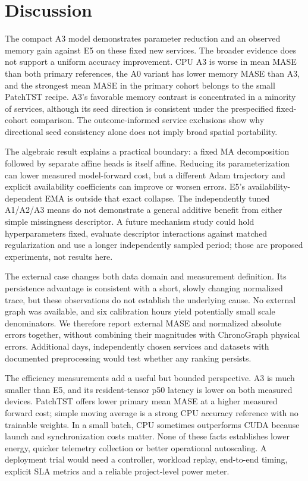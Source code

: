 \section{Discussion}\label{sec:discussion}
The compact A3 model demonstrates parameter reduction and an observed memory gain against E5 on these fixed new services. The broader evidence does not support a uniform accuracy improvement. CPU A3 is worse in mean MASE than both primary references, the A0 variant has lower memory MASE than A3, and the strongest mean MASE in the primary cohort belongs to the small PatchTST recipe. A3's favorable memory contrast is concentrated in a minority of services, although its seed direction is consistent under the prespecified fixed-cohort comparison. The outcome-informed service exclusions show why directional seed consistency alone does not imply broad spatial portability.

The algebraic result explains a practical boundary: a fixed MA decomposition followed by separate affine heads is itself affine. Reducing its parameterization can lower measured model-forward cost, but a different Adam trajectory and explicit availability coefficients can improve or worsen errors. E5's availability-dependent EMA is outside that exact collapse. The independently tuned A1/A2/A3 means do not demonstrate a general additive benefit from either simple missingness descriptor. A future mechanism study could hold hyperparameters fixed, evaluate descriptor interactions against matched regularization and use a longer independently sampled period; those are proposed experiments, not results here.

The external case changes both data domain and measurement definition. Its persistence advantage is consistent with a short, slowly changing normalized trace, but these observations do not establish the underlying cause. No external graph was available, and six calibration hours yield potentially small scale denominators. We therefore report external MASE and normalized absolute errors together, without combining their magnitudes with ChronoGraph physical errors. Additional days, independently chosen services and datasets with documented preprocessing would test whether any ranking persists.

The efficiency measurements add a useful but bounded perspective. A3 is much smaller than E5, and its resident-tensor p50 latency is lower on both measured devices. PatchTST offers lower primary mean MASE at a higher measured forward cost; simple moving average is a strong CPU accuracy reference with no trainable weights. In a small batch, CPU sometimes outperforms CUDA because launch and synchronization costs matter. None of these facts establishes lower energy, quicker telemetry collection or better operational autoscaling. A deployment trial would need a controller, workload replay, end-to-end timing, explicit SLA metrics and a reliable project-level power meter.

